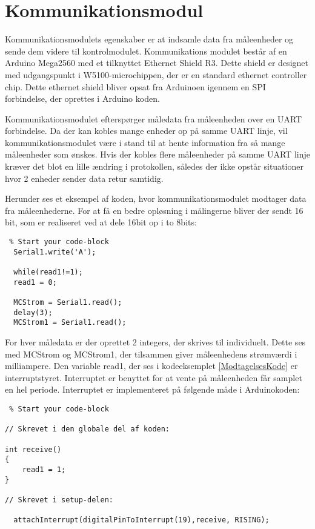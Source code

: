 
\section{Kommunikationsmodul}

Kommunikationsmodulets egenskaber er at indsamle data fra måleenheder og sende dem videre til kontrolmodulet. Kommunikations modulet består af en Arduino Mega2560 med et tilknyttet Ethernet Shield R3. Dette shield er designet med udgangspunkt i W5100-microchippen, der er en standard ethernet controller chip. Dette ethernet shield bliver opsat fra Arduinoen igennem en SPI forbindelse, der oprettes i Arduino koden. 

Kommunikationsmodulet efterspørger måledata fra måleenheden over en UART forbindelse. Da der kan kobles mange enheder op på samme UART linje, vil kommunikationsmodulet være i stand til at hente information fra så mange måleenheder som ønskes. Hvis der kobles flere måleenheder på samme UART linje kræver det blot en lille ændring i protokollen, således der ikke opstår situationer hvor 2 enheder sender data retur samtidig. 


Herunder ses et eksempel af koden, hvor kommunikationsmodulet modtager data fra måleenhederne. For at få en bedre opløsning i målingerne bliver der sendt 16 bit, som er realiseret ved at dele 16bit op i to 8bits: 

\begin{lstlisting} % Start your code-block
  Serial1.write('A');
  
  while(read1!=1);
  read1 = 0;
  
  MCStrom = Serial1.read();
  delay(3);
  MCStrom1 = Serial1.read();
\end{lstlisting}


For hver måledata er der oprettet 2 integers, der skrives til individuelt. Dette ses med MCStrom og MCStrom1, der tilsammen giver måleenhedens strømværdi i milliampere. 
Den variable read1, der ses i kodeeksemplet \ref{ModtagelsesKode} er interruptstyret. Interruptet er benyttet for at vente på måleenheden får samplet en hel periode. Interruptet er implementeret på følgende måde i Arduinokoden: 

\begin{lstlisting} % Start your code-block

// Skrevet i den globale del af koden:

int receive()
{
	read1 = 1;
}

// Skrevet i setup-delen:

  attachInterrupt(digitalPinToInterrupt(19),receive, RISING);

\end{lstlisting}


